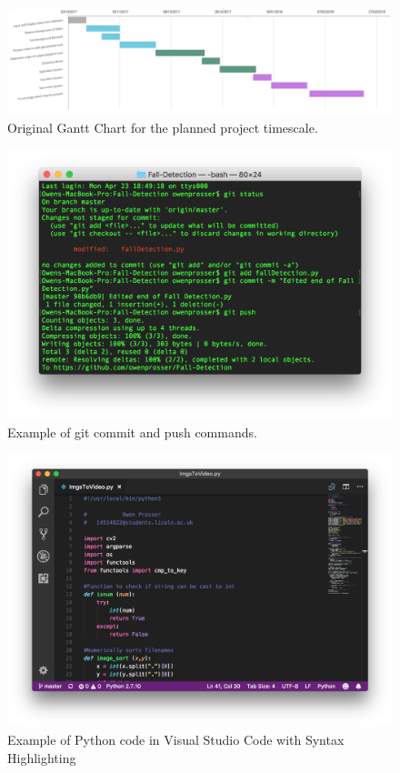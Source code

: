 \documentclass[11pt,a4paper]{report}
\begin{document}
\begin{figure}[h]
 \centering
 \includegraphics[scale = 0.33]{Original_gantt_chart.png}
 \caption[Original Gantt Chart]{Original Gantt Chart for the planned project timescale.}
 \label{fig:OriginalGantt}
\end{figure}

\begin{figure}[h]
 \centering
 \includegraphics[scale = 0.55]{gitpush.png}
 \caption{Example of git commit and push commands.}
 \label{fig:GitCommitPush}
\end{figure}

\begin{figure}[H]
 \centering
 \includegraphics[scale = 0.4]{VSCode.png}
 \caption[Syntax Highlighted Code]{Example of Python code in Visual Studio Code with Syntax Highlighting}
 \label{fig:VSCode}
\end{figure}
\end{document}
